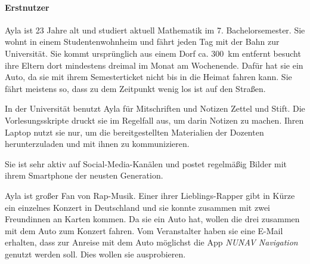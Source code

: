 \paragraph{Erstnutzer} Ayla ist 23 Jahre alt und studiert aktuell Mathematik im 7. Bachelorsemester. Sie wohnt in einem Studentenwohnheim und fährt jeden Tag mit der Bahn zur Universität. Sie kommt ursprünglich aus einem Dorf ca. 300~km entfernt besucht ihre Eltern dort mindestens dreimal im Monat am Wochenende. Dafür hat sie ein Auto, da sie mit ihrem Semesterticket nicht bis in die Heimat fahren kann. Sie fährt meistens so, dass zu dem Zeitpunkt wenig los ist auf den Straßen.

In der Universität benutzt Ayla für Mitschriften und Notizen Zettel und Stift. Die Vorlesungsskripte druckt sie im Regelfall aus, um darin Notizen zu machen. Ihren Laptop nutzt sie nur, um die bereitgestellten Materialien der Dozenten herunterzuladen und mit ihnen zu kommunizieren.

Sie ist sehr aktiv auf Social-Media-Kanälen und postet regelmäßig Bilder mit ihrem Smartphone der neusten Generation.

Ayla ist großer Fan von Rap-Musik. Einer ihrer Lieblings-Rapper gibt in Kürze ein einzelnes Konzert in Deutschland und sie konnte zusammen mit zwei Freundinnen an Karten kommen. Da sie ein Auto hat, wollen die drei zusammen mit dem Auto zum Konzert fahren. Vom Veranstalter haben sie eine E-Mail erhalten, dass zur Anreise mit dem Auto möglichst die App \textit{NUNAV Navigation} genutzt werden soll. Dies wollen sie ausprobieren.

\newpage